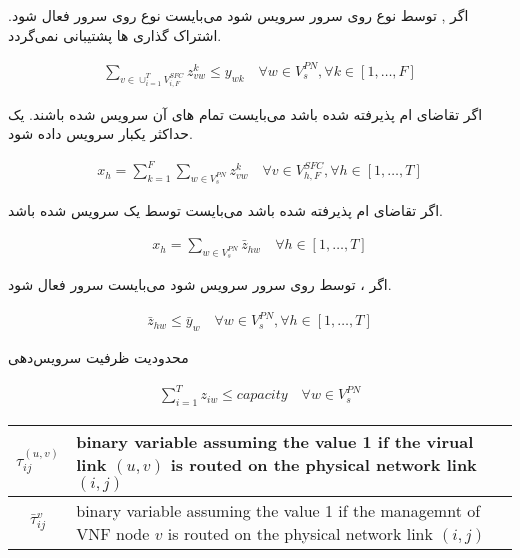 اگر , 
توسط  نوع 
روی سرور  سرویس شود می‌بایست
 نوع 
روی سرور  فعال شود.
اشتراک گذاری ها پشتیبانی نمی‌گردد.
\begin{latin}\begin{align}
\sum_{v \in \cup_{i=1}^T V_{i, F}^{SFC}} z_{vw}^k \le y_{wk}
\quad
\forall w \in V_s^{PN}, \forall k \in [1,\ldots, F]
\end{align}\end{latin}

اگر تقاضای ام پذیرفته شده باشد
می‌بایست تمام های آن‌
سرویس شده باشند.
یک  حداکثر یکبار سرویس داده شود.
\begin{latin}\begin{align}
	x_h = \sum_{k=1}^{F} \sum_{w \in V_{s}^{PN}} z_{vw}^{k}
	\quad
	\forall v \in V_{h,F}^{SFC}, \forall h \in [1,\ldots, T]
\end{align}\end{latin}

اگر تقاضای ام پذیرفته شده باشد
می‌بایست توسط یک  سرویس شده باشد.
\begin{latin}\begin{align}
	x_h = \sum_{w \in V_{s}^{PN}} \bar{z}_{hw}
	\quad
	\forall h \in [1,\ldots, T]
\end{align}\end{latin}

اگر ، 
توسط  روی سرور 
سرویس شود می‌بایست  سرور 
فعال شود.
\begin{latin}\begin{align}
	\bar{z}_{hw} \le \bar{y}_w
	\quad
	\forall w \in V_{s}^{PN}, \forall h \in [1,\ldots, T]
\end{align}\end{latin}

محدودیت ظرفیت سرویس‌دهی 
\begin{latin}\begin{align}
	\sum_{i=1}^{T} z_{iw} \le capacity
	\quad
	\forall w \in V_{s}^{PN}
\end{align}\end{latin}

\begin{center}\begin{latin}\begin{tabular}{|c|p{10cm}|}
    \hline
    $\tau^{(u,v)}_{ij}$ & binary variable assuming the value 1 if the virual link $(u,v)$ is routed on the physical network link $(i,j)$\\
    \hline
    $\bar{\tau}^{v}_{ij}$ & binary variable assuming the value 1 if the managemnt of VNF node $v$ is routed on the physical network link $(i,j)$\\
    \hline
\end{tabular}\end{latin}\end{center}


